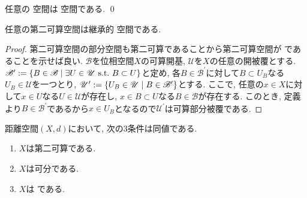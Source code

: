 \documentclass[uplatex, dvipdfmx, a4paper, 12pt, class=jsbook, crop=false]{standalone}
\begin{document}
\begin{proposition}
	任意の \sigmaCompact 空間は \Lindelof 空間である. \qed
\end{proposition}

\begin{proposition}
	\label{prop:second countable > hereditary Lindelof}
	任意の第二可算空間は継承的 \Lindelof 空間である.
\end{proposition}

\begin{proof}
	第二可算空間の部分空間も第二可算であることから第二可算空間が \Lindelof であることを示せば良い. $ \mathscr{B} $を位相空間$ X $の可算開基, $ \mathscr{U} $を$ X $の任意の開被覆とする. $ \mathscr{B}^\prime \defeq \setcomp{B \in \mathscr{B}}{\exists U \in \mathscr{U} \ \mbox{s.t.} \ B \subset U} $と定め, 各$ B \in \mathscr{B}^\prime $に対して$ B \subset U_B $なる$ U_B \in \mathscr{U} $を一つとり, $ \mathscr{U}^\prime \defeq \setcomp{U_B \in \mathscr{U}}{B \in \mathscr{B}^\prime} $とする. ここで, 任意の$ x \in X $に対して$ x \in U $なる$ U \in \mathscr{U} $が存在し, $ x \in B \subset U $なる$ B \in \mathscr{B} $が存在する. このとき, 定義より$ B \in \mathscr{B}^\prime $であるから$ x \in U_B $となるので$ \mathscr{U}^\prime $は可算部分被覆である.
\end{proof}

\begin{proposition}
	距離空間$ (X, d) $において, 次の3条件は同値である.
	\begin{enumerate}
	\item $ X $は第二可算である.
	\item $ X $は可分である.
	\item $ X $は \Lindelof である.
	\end{enumerate}
\end{proposition}
\end{document}
